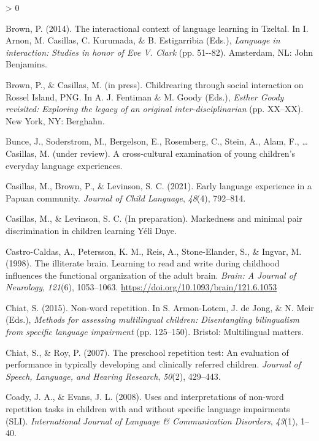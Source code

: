 \documentclass[
  american,
  ,man,floatsintext]{apa6}
\newlength{\cslhangindent}
\newenvironment{CSLReferences}[2] %
 {%
  \setlength{\parindent}{0pt}
  \ifodd #1 \everypar{\setlength{\hangindent}{\cslhangindent}}\ignorespaces\fi
  \ifnum #2 > 0
  \setlength{\parskip}{#2\baselineskip}
  \fi
 }%
 {}
\begin{document}
\begin{CSLReferences}{1}{0}
\leavevmode\hypertarget{ref-brown2014interactional}{}%
Brown, P. (2014). The interactional context of language learning in {T}zeltal. In I. Arnon, M. Casillas, C. Kurumada, \& B. Estigarribia (Eds.), \emph{Language in interaction: Studies in honor of {Eve V. Clark}} (pp. 51-\/-82). Amsterdam, NL: John Benjamins.

\leavevmode\hypertarget{ref-brownIPchildrearing}{}%
Brown, P., \& Casillas, M. (in press). Childrearing through social interaction on {Rossel Island, PNG}. In A. J. Fentiman \& M. Goody (Eds.), \emph{{Esther Goody} revisited: Exploring the legacy of an original inter-disciplinarian} (pp. XX--XX). New York, NY: Berghahn.

\leavevmode\hypertarget{ref-bunceURcrosscultural}{}%
Bunce, J., Soderstrom, M., Bergelson, E., Rosemberg, C., Stein, A., Alam, F., \ldots{} Casillas, M. (under review). A cross-cultural examination of young children's everyday language experiences.

\leavevmode\hypertarget{ref-casillas2021early}{}%
Casillas, M., Brown, P., \& Levinson, S. C. (2021). {Early language experience in a Papuan community}. \emph{Journal of Child Language}, \emph{48}(4), 792--814.

\leavevmode\hypertarget{ref-casillasIPmarkedness}{}%
Casillas, M., \& Levinson, S. C. (In preparation). Markedness and minimal pair discrimination in children learning {Yélî Dnye}.

\leavevmode\hypertarget{ref-castro1998illiterate}{}%
Castro-Caldas, A., Petersson, K. M., Reis, A., Stone-Elander, S., \& Ingvar, M. (1998). {The illiterate brain. Learning to read and write during childhood influences the functional organization of the adult brain.} \emph{Brain: A Journal of Neurology}, \emph{121}(6), 1053--1063. \url{https://doi.org/10.1093/brain/121.6.1053}

\leavevmode\hypertarget{ref-chiat2015nonword}{}%
Chiat, S. (2015). Non-word repetition. In S. Armon-Lotem, J. de Jong, \& N. Meir (Eds.), \emph{Methods for assessing multilingual children: Disentangling bilingualism from specific language impairment} (pp. 125--150). Bristol: Multilingual matters.

\leavevmode\hypertarget{ref-chiat2007preschool}{}%
Chiat, S., \& Roy, P. (2007). The preschool repetition test: An evaluation of performance in typically developing and clinically referred children. \emph{Journal of Speech, Language, and Hearing Research}, \emph{50}(2), 429--443.

\leavevmode\hypertarget{ref-coady2008uses}{}%
Coady, J. A., \& Evans, J. L. (2008). Uses and interpretations of non-word repetition tasks in children with and without specific language impairments (SLI). \emph{International Journal of Language \& Communication Disorders}, \emph{43}(1), 1--40.


\end{CSLReferences}
\end{document}
